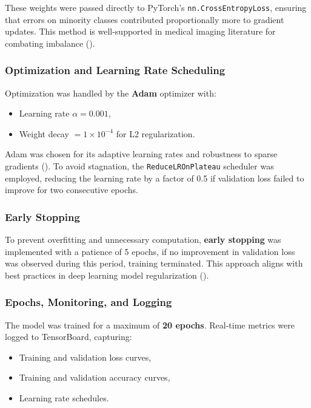 \documentclass[
  12pt,
  oneside]{article}
\providecommand{\tightlist}{%
  \setlength{\itemsep}{0pt}\setlength{\parskip}{0pt}}
\begin{document}
These weights were passed directly to PyTorch's
\texttt{nn.CrossEntropyLoss}, ensuring that errors on minority classes
contributed proportionally more to gradient updates. This method is
well-supported in medical imaging literature for combating imbalance
().

\subsubsection{Optimization and Learning Rate
Scheduling}\label{optimization-and-learning-rate-scheduling}

Optimization was handled by the \textbf{Adam} optimizer with:

\begin{itemize}
\tightlist
\item
  Learning rate \(\alpha = 0.001\),
\item
  Weight decay \(= 1\times 10^{-4}\) for L2 regularization.
\end{itemize}

Adam was chosen for its adaptive learning rates and robustness to sparse
gradients (). To avoid
stagnation, the \texttt{ReduceLROnPlateau} scheduler was employed,
reducing the learning rate by a factor of 0.5 if validation loss failed
to improve for two consecutive epochs.

\subsubsection{Early Stopping}\label{early-stopping}

To prevent overfitting and unnecessary computation, \textbf{early
stopping} was implemented with a patience of 5 epochs, if no improvement
in validation loss was observed during this period, training terminated.
This approach aligns with best practices in deep learning model
regularization ().

\subsubsection{Epochs, Monitoring, and
Logging}\label{epochs-monitoring-and-logging}

The model was trained for a maximum of \textbf{20 epochs}. Real-time
metrics were logged to TensorBoard, capturing:

\begin{itemize}
\tightlist
\item
  Training and validation loss curves,
\item
  Training and validation accuracy curves,
\item
  Learning rate schedules.
\end{itemize}
\end{document}
